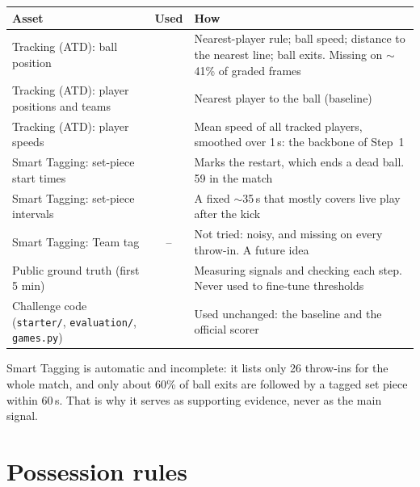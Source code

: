 \documentclass[10pt,a4paper]{article}
\newcommand{\kept}{\textcolor{keep}{\ding{51}}}
\newcommand{\dropped}{\textcolor{drop}{\ding{55}}}
\newcommand{\lbl}[1]{\texttt{#1}}
\begin{document}
\begin{table}[h]
\small
\begin{tabularx}{\linewidth}{@{}p{5.1cm}cY@{}}
\toprule
\textbf{Asset} & \textbf{Used} & \textbf{How} \\
\midrule
Tracking (ATD): ball position & \kept & Nearest-player rule; ball speed; distance to the nearest line; ball exits.
  Missing on $\sim$41\% of graded frames \\
Tracking (ATD): player positions and teams & \kept & Nearest player to the ball (baseline) \\
Tracking (ATD): player speeds & \kept & Mean speed of all tracked players, smoothed over 1\,s: the backbone of Step~1 \\
Smart Tagging: set-piece start times & \kept & Marks the restart, which ends a dead ball. 59 in the match \\
Smart Tagging: set-piece intervals & \dropped & A fixed $\sim$35\,s that mostly covers live play after the kick \\
Smart Tagging: Team tag & -- & Not tried: noisy, and missing on every throw-in. A future idea \\
Public ground truth (first 5 min) & \kept & Measuring signals and checking each step. Never used to fine-tune thresholds \\
Challenge code (\lbl{starter/}, \lbl{evaluation/}, \lbl{games.py}) & \kept & Used unchanged: the baseline and the official scorer \\
\bottomrule
\end{tabularx}
\end{table}

Smart Tagging is automatic and incomplete: it lists only 26 throw-ins for the whole match, and only about 60\%
of ball exits are followed by a tagged set piece within 60\,s. That is why it serves as supporting evidence,
never as the main signal.

\section{Possession rules}
\end{document}
